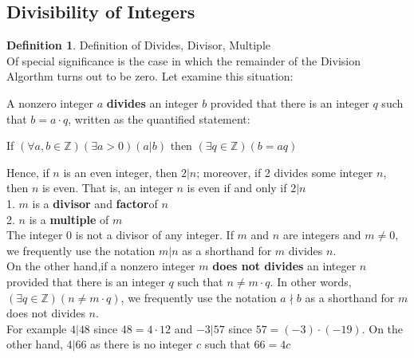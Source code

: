 \documentclass{book}
\theoremstyle{definition}
\newtheorem{definition}{Definition}[section]
\theoremstyle{remark}
\newcommand{\bb}[1]{\mathbb{#1}}
\newcommand{\m}{\cdot}
\begin{document}
\newpage
\subsection{Divisibility of Integers}

\begin{definition}
Definition of Divides, Divisor, Multiple \\

Of special significance is the case in which the remainder of the Division Algorthm turns out to be zero. Let examine this situation: 



\begin{tcolorbox}
A nonzero integer $a$ {\bf divides} an integer $b$ provided that there is an integer $q$ such that $b = a \m q$, written as the quantified statement: 
	\begin{center}
		If $(\forall a, b \in \bb{Z})(\exists a > 0)(a | b)$ then  $(\exists q \in \bb{Z})(b = aq)$
	\end{center}
\end{tcolorbox}

Hence, if $n$ is an even integer, then $2 | n$; moreover, if 2 divides some integer $n$, then $n$ is even. That is, an integer $n$ is even if and only if $2 | n$ \\
1. $m$ is a {\bf divisor} and {\bf factor}of $n$ \\
2. $n$ is a {\bf multiple} of $m$ \\
The integer $0$ is not a divisor of any integer. If $m$ and $n$ are integers and $m \neq 0$, we frequently use the notation $m | n$ as a shorthand for $m$ divides $n$. \\

On the other hand,if a nonzero integer $m$ {\bf does not divides} an integer $n$ provided that there is an integer $q$ such that $n \neq m \m q$. In other words, $(\exists q \in \bb{Z})(n \neq m \m q)$, we frequently use the notation $a \nmid b$ as a shorthand for $m$ does not divides $n$. \\

For example $4|48$ since $48 = 4 \m 12$ and $-3|57$ since $57 = (-3) \m (-19)$. On the other hand, $4|66$ as there is no integer $c$ such that $66 = 4c$ 

\end{definition} 


\newpage
\end{document}
